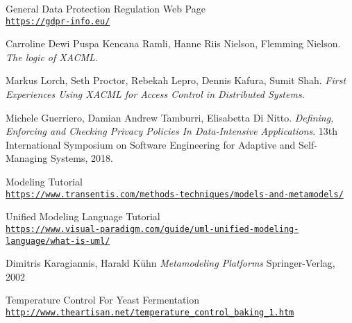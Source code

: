 \begin{thebibliography}{9}
General Data Protection Regulation Web Page
\\\texttt{\url{https://gdpr-info.eu/}}

Carroline Dewi Puspa Kencana Ramli, Hanne Riis Nielson, Flemming Nielson.
\textit{The logic of XACML}.

Markus Lorch, Seth Proctor, Rebekah Lepro, Dennis Kafura, Sumit Shah.
\textit{First Experiences Using XACML for Access Control in Distributed Systems}.

Michele Guerriero, Damian Andrew Tamburri, Elisabetta Di Nitto.
\textit{Defining, Enforcing and Checking Privacy Policies In Data-Intensive Applications}. 
13th International Symposium on Software Engineering for Adaptive and Self-Managing Systems, 2018.

Modeling Tutorial
\\\texttt{\url{https://www.transentis.com/methods-techniques/models-and-metamodels/}}

Unified Modeling Language Tutorial
\\\texttt{\url{https://www.visual-paradigm.com/guide/uml-unified-modeling-language/what-is-uml/}}

Dimitris Karagiannis, Harald Kühn
\textit{Metamodeling Platforms}
Springer-Verlag, 2002

Temperature Control For Yeast Fermentation
\\\texttt{\url{http://www.theartisan.net/temperature\_control\_baking\_1.htm}}


\end{thebibliography}
